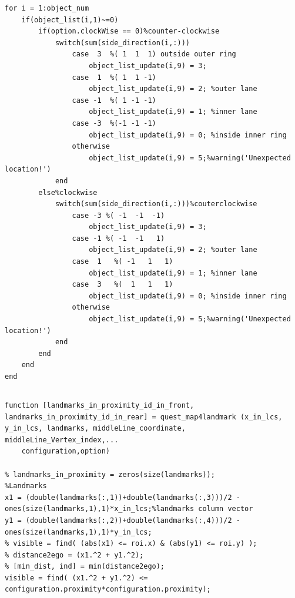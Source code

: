 \documentclass[12pt,a4paper]{article}
\newcommand{\zhiv}{\fontsize{12pt}{18pt}\selectfont}      %
\begin{document}
{{{\begin{verbatim}
for i = 1:object_num
    if(object_list(i,1)~=0)
        if(option.clockWise == 0)%counter-clockwise
            switch(sum(side_direction(i,:)))
                case  3  %( 1  1  1) outside outer ring
                    object_list_update(i,9) = 3; 
                case  1  %( 1  1 -1)
                    object_list_update(i,9) = 2; %outer lane 
                case -1  %( 1 -1 -1)
                    object_list_update(i,9) = 1; %inner lane
                case -3  %(-1 -1 -1)
                    object_list_update(i,9) = 0; %inside inner ring
                otherwise
                    object_list_update(i,9) = 5;%warning('Unexpected location!')
            end
        else%clockwise
            switch(sum(side_direction(i,:)))%couterclockwise
                case -3 %( -1  -1  -1)
                    object_list_update(i,9) = 3; 
                case -1 %( -1  -1   1)
                    object_list_update(i,9) = 2; %outer lane 
                case  1   %( -1   1   1)
                    object_list_update(i,9) = 1; %inner lane
                case  3   %(  1   1   1)
                    object_list_update(i,9) = 0; %inside inner ring
                otherwise
                    object_list_update(i,9) = 5;%warning('Unexpected location!')
            end
        end
    end
end

\end{verbatim}

{\subsection{\textbf{\song\zhiv{地标搜索模块 m函数}}}}

\begin{verbatim}
function [landmarks_in_proximity_id_in_front, landmarks_in_proximity_id_in_rear] = quest_map4landmark (x_in_lcs, y_in_lcs, landmarks, middleLine_coordinate, middleLine_Vertex_index,...
    configuration,option)

% landmarks_in_proximity = zeros(size(landmarks));
%Landmarks
x1 = (double(landmarks(:,1))+double(landmarks(:,3)))/2 - ones(size(landmarks,1),1)*x_in_lcs;%landmarks column vector
y1 = (double(landmarks(:,2))+double(landmarks(:,4)))/2 - ones(size(landmarks,1),1)*y_in_lcs;
% visible = find( (abs(x1) <= roi.x) & (abs(y1) <= roi.y) );
% distance2ego = (x1.^2 + y1.^2);
% [min_dist, ind] = min(distance2ego);
visible = find( (x1.^2 + y1.^2) <= configuration.proximity*configuration.proximity);




\end{verbatim}}}}
\end{document}
